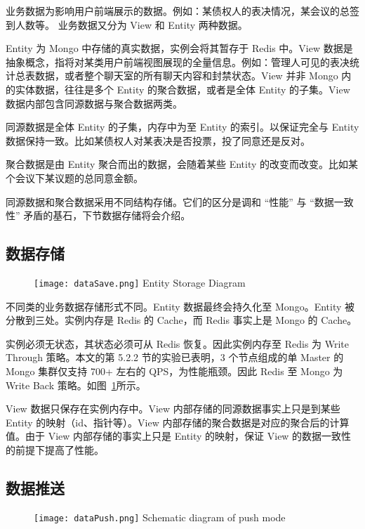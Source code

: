 业务数据为影响用户前端展示的数据。例如：某债权人的表决情况，某会议的总签到人数等。
业务数据又分为 View 和 Entity 两种数据。

Entity 为 Mongo 中存储的真实数据，实例会将其暂存于 Redis 中。View 数据是抽象概念，指将对某类用户前端视图展现的全量信息。例如：管理人可见的表决统计总表数据，或者整个聊天室的所有聊天内容和封禁状态。View 并非 Mongo 内的实体数据，往往是多个 Entity 的聚合数据，或者是全体 Entity 的子集。View 数据内部包含同源数据与聚合数据两类。

同源数据是全体 Entity 的子集，内存中为至 Entity 的索引。以保证完全与 Entity 数据保持一致。比如某债权人对某表决是否投票，投了同意还是反对。

聚合数据是由 Entity 聚合而出的数据，会随着某些 Entity 的改变而改变。比如某个会议下某议题的总同意金额。

同源数据和聚合数据采用不同结构存储。它们的区分是调和 “性能” 与 “数据一致性” 矛盾的基石，下节数据存储将会介绍。

\subsection{数据存储}

\begin{figure}[!htp]
  \centering
  \texttt{[image: dataSave.png]}
    {Entity Storage Diagram}
 \label{fig:dataSave}
\end{figure}

不同类的业务数据存储形式不同。Entity 数据最终会持久化至 Mongo。Entity 被分散到三处。实例内存是 Redis 的 Cache，而 Redis 事实上是 Mongo 的 Cache。

实例必须无状态，其状态必须可从 Redis 恢复。因此实例内存至 Redis 为 Write Through 策略。本⽂的第 5.2.2 节的实验已表明，3 个节点组成的单 Master 的 Mongo 集群仅⽀持 700+ 左右的 QPS，为性能瓶颈。因此 Redis 至 Mongo 为 Write Back 策略。如图~\ref{fig:dataSave}所示。

View 数据只保存在实例内存中。View 内部存储的同源数据事实上只是到某些 Entity 的映射（id、指针等）。View 内部存储的聚合数据是对应的聚合后的计算值。由于 View 内部存储的事实上只是 Entity 的映射，保证 View 的数据一致性的前提下提高了性能。

\subsection{数据推送}

\begin{figure}[!htp]
  \centering
  \texttt{[image: dataPush.png]}
    {Schematic diagram of push mode}
 \label{fig:dataPush}
\end{figure}

